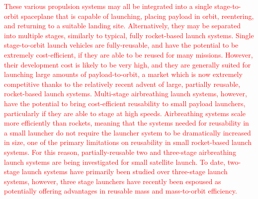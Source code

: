   	\textcolor{red}{These various propulsion systems may all be integrated into a single stage-to-orbit spaceplane that is capable of launching, placing payload in orbit, reentering, and returning to a suitable landing site\cite{Argus,Powell1991,Trefny1999,Roche2000,Pescetelli2012,Young2006,Bradford2000,Hyperion}. Alternatively, they may be separated into multiple stages, similarly to typical, fully rocket-based launch systems\cite{Wilhite1991,Fujikawa2017,Mehta2001,Takahashi1997,Aberleen,Germain2001,Eklund2012,Bradford2002,Kimura1999,Preller2018a}. Single stage-to-orbit launch vehicles are fully-reusable, and have the potential to be extremely cost-efficient, if they are able to be reused for many missions\cite{Mcclinton2008}. However, their development cost is likely to be very high, and they are generally suited for launching large amounts of payload-to-orbit\cite{Argus,Powell1991,Trefny1999,Roche2000,Pescetelli2012,Young2006,Bradford2000,Hyperion}, a market which is now extremely competitive thanks to the relatively recent advent of large, partially reusable, rocket-based launch systems. Multi-stage airbreathing launch systems, however, have the potential to bring cost-efficient reusability to small payload launchers\cite{Preller2017b}, particularly if they are able to stage at high speeds\cite{Mcclinton2008}. Airbreathing systems scale more efficiently than rockets, meaning that the systems needed for reusability in a small launcher do not require the launcher system to be dramatically increased in size, one of the primary limitations on reusability in small rocket-based launch systems. For this reason, partially-reusable two and three-stage airbreathing launch systems are being investigated for small satellite launch\cite{Preller2017b}. To date, two-stage launch systems have primarily been studied over three-stage launch systems, however, three stage launchers have recently been espoused as potentially offering advantages in reusable mass and mass-to-orbit efficiency\cite{Preller2017b}.}
  	
